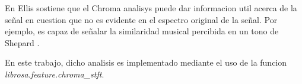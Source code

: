 \documentclass[]{article}
\begin{document}
\begin{multicols}{2}
En \cite{Ellis} Ellis sostiene que el Chroma analisys puede dar informacion
util acerca de la señal en cuestion que no es evidente en el espectro original de
la señal. Por ejemplo, es capaz de señalar la similaridad musical percibida en
un tono de Shepard \cite{bello}.

En este trabajo, dicho analisis es implementado mediante el uso de la funcion \emph{{librosa.feature.chroma\_stft}}.
%
%
%
%
%


\end{multicols}
\end{document}

